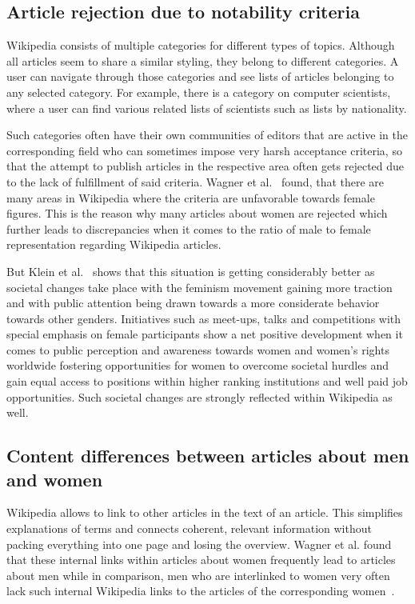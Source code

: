 \documentclass[a4paper, 11pt]{article}
\begin{document}
\subsection{Article rejection due to notability criteria} \label{sec:gender-gap-wikipedia:notability}
Wikipedia consists of multiple categories for different types of topics. Although all articles seem to share a similar styling, they belong to different categories. A user can navigate through those categories and see lists of articles belonging to any selected category. For example, there is a category on computer scientists, where a user can find various related lists of scientists such as lists by nationality.

Such categories often have their own communities of editors that are active in the corresponding field who can sometimes impose very harsh acceptance criteria, so that the attempt to publish articles in the respective area often gets rejected due to the lack of fulfillment of said criteria. Wagner et al.~\cite{wagner2016women} found, that there are many areas in Wikipedia where the criteria are unfavorable towards female figures. This is the reason why many articles about women are rejected which further leads to discrepancies when it comes to the ratio of male to female representation regarding Wikipedia articles.

But Klein et al.~\cite{klein2016monitoring} shows that this situation is getting considerably better as societal changes take place with the feminism movement gaining more traction and with public attention being drawn towards a more considerate behavior towards other genders. Initiatives such as meet-ups, talks and competitions with special emphasis on female participants show a net positive development when it comes to public perception and awareness towards women and women’s rights worldwide fostering opportunities for women to overcome societal hurdles and gain equal access to positions within higher ranking institutions and well paid job opportunities. Such societal changes are strongly reflected within Wikipedia as well.

\subsection{Content differences between articles about men and women} \label{sec:gender-gap-wikipedia:contentdiff}
Wikipedia allows to link to other articles in the text of an article. This simplifies explanations of terms and connects coherent, relevant information without packing everything into one page and losing the overview. Wagner et al. found that these internal links within articles about women frequently lead to articles about men while in comparison, men who are interlinked to women very often lack such internal Wikipedia links to the articles of the corresponding women~\cite{wagner2015s}.
\end{document}
